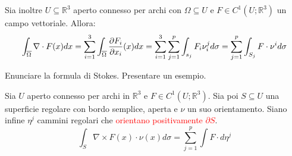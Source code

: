 \documentclass{exam}
\newcommand{\R}[0]{\mathbb{R}}
\newcommand{\err}[1]{\textcolor{red}{#1}}
\begin{document}
\begin{questions}
\begin{solution}
    Sia inoltre $U\subseteq \R^3$ aperto connesso per archi con $\Omega \subseteq U$ e $F \in C^1(U; \R^3)$ un campo vettoriale. Allora:
    \[ 
    \int_{\overline{\Omega}} \nabla \cdot F(x) dx = \sum_{i=1}^3 \int_{\overline{\Omega}} \pdv{F_i}{x_i} (x) dx = \sum_{i=1}^3 \sum_{j=1}^p \int_{s_j}F_i \nu^j_i d \sigma = \sum_{j=1}^p \int_{S_j} F \cdot \nu^i d\sigma
    \]
\end{solution}
\question Enunciare la formula di Stokes. Presentare un esempio.
\begin{solution}
    Sia $U$ aperto connesso per archi in $\R^3$ e $F\in C^1(U;\R^3)$.
    Sia poi $S \subseteq U$ una superficie regolare con bordo semplice, aperta e $\nu$ un suo orientamento.
    Siano infine $\eta^j$ cammini regolari che \err{orientano positivamente $\partial S$}.
    \[
    \int_S \nabla \times F (x)\cdot\nu(x)  d\sigma = \sum_{j=1}^p \int F \cdot d\eta^j 
    \]
\end{solution}    
\end{questions}
\end{document}
